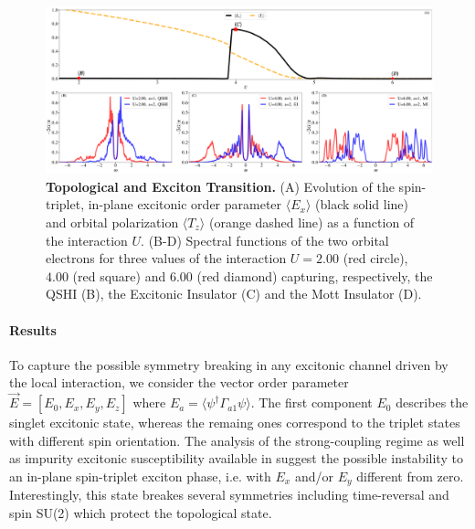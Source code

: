 \documentclass[edipack_sp.tex]{subfiles}
\begin{document}
\begin{figure}[t!]
  \includegraphics[width=\linewidth]{figures/figBHZ.pdf}
    \caption{\label{figEx4}%
      \textbf{Topological and Exciton Transition.}
      (A) Evolution of the spin-triplet,
      in-plane excitonic order parameter $\langle E_x\rangle$ (black solid line) and
      orbital polarization $\langle T_z\rangle$ (orange dashed line) as a function of the
      interaction $U$.
      (B-D) Spectral functions of the two orbital electrons for three
      values of the interaction $U=2.00$ (red circle), $4.00$ (red
      square) and $6.00$ (red diamond) capturing, respectively, the
      QSHI (B), the Excitonic Insulator (C) and the Mott Insulator
      (D). 
    }
\end{figure}

\paragraph{Results}
To capture the possible symmetry breaking in any excitonic channel
driven by the local interaction, we consider the vector order
parameter
$\vec{E}=[E_0,E_x,E_y,E_z]$ where $E_a=\langle\psi^\dagger
\Gamma_{a1}\psi \rangle$.
The first component $E_0$ describes the singlet excitonic state,
whereas the remaing ones correspond to the triplet states with
different spin orientation.   
The analysis of the strong-coupling regime as well as impurity
excitonic susceptibility available in \NAME suggest the possible
instability to an in-plane spin-triplet exciton phase, i.e. with $E_x$
and/or $E_y$ different from zero.
Interestingly, this state breakes several symmetries including
time-reversal and spin SU(2) which protect the topological state.
\end{document}
